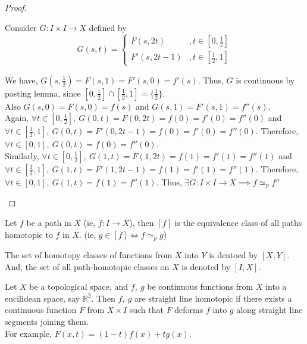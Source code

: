 \begin{proof}
\begin{enumerate}
			Consider $G:I \times I \to X$ defined by \[ G(s,t) = \begin{cases} F(s,2t) & , t \in [0,\frac{1}{2}]\\ F'(s,2t-1) & , t \in [\frac{1}{2},1] \end{cases} \]
				
				We have, $G(s,\frac{1}{2}) = F(s,1) = F'(s,0) = f'(s)$. Thus, $G$ is continuous by pasting lemma\cite[\S{}18.3 pp. 106]{munkres}, since $[0,\frac{1}{2}] \cap [\frac{1}{2},1] = \{ \frac{1}{2}\}$.\\
			
			Also $G(s,0) = F(s,0) = f(s)$ and $G(s,1) = F'(s,1) = f''(s)$.\\

			Again, $\forall t \in [0,\frac{1}{2}],\ G(0,t) = F(0,2t) = f(0) = f'(0) = f''(0)$ and $\forall t \in [\frac{1}{2},1],\ G(0,t) = F'(0,2t-1) = f(0) = f'(0) = f''(0)$. Therefore, $\forall t \in [0,1],\ G(0,t) = f(0) = f''(0)$.\\
			
			Similarly, $\forall t \in [0,\frac{1}{2}],\ G(1,t) = F(1,2t) = f(1) = f'(1) = f''(1)$ and $\forall t \in [\frac{1}{2},1],\ G(1,t) = F'(1,2t-1) = f(1) = f'(1) = f''(1)$. Therefore, $\forall t \in [0,1],\ G(1,t) = f(1) = f''(1)$. Thus, $\exists G : I \times I \to X \implies f \simeq_p f''$
	\end{enumerate}
\end{proof}

\begin{definition}
	Let $f$ be a path in $X$ (ie, $f : I \to X$), then $[f]$ is the equivalence class of all paths homotopic to $f$ in $X$. (ie, $g \in [f] \iff f \simeq_p g$)
\end{definition}

\begin{remark}
	The set of homotopy classes of functions from $X$ into $Y$ is dentoed by $[X,Y]$. And, the set of all path-homotopic classes on $X$ is denoted by $[I,X]$.
\end{remark}

\begin{remark}\cite[\S{}51 Example 1 pp. 320]{munkres}
	Let $X$ be a topological space, and $f,\ g$ be continuous functions from $X$ into a eucilidean space, say $\mathbb{R}^2$. Then $f,\ g$ are straight line homotopic if there exists a continuous function $F$ from $X \times I$ such that $F$ deforms $f$ into $g$ along straight line segments joining them.\\

	For example, $F(x,t) = (1-t)f(x)+tg(x)$.
\end{remark}

